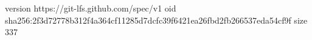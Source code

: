 version https://git-lfs.github.com/spec/v1
oid sha256:2f3d72778b312f4a364cf11285d7dcfc39f6421ea26fbd2fb266537eda54cf9f
size 337
